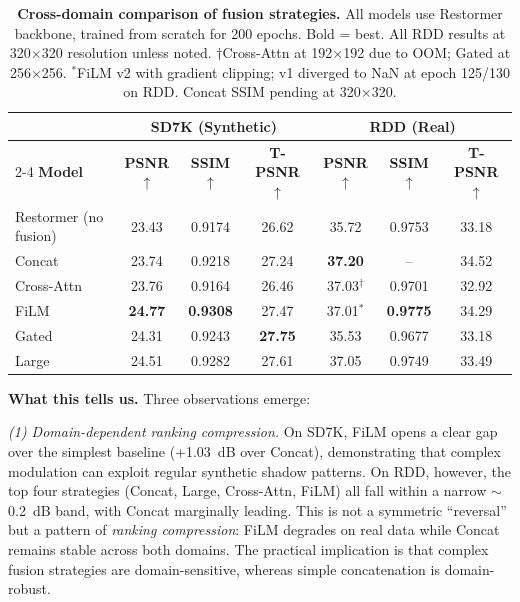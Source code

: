 \documentclass[pdflatex,sn-basic,Numbered]{sn-jnl}
\theoremstyle{thmstyleone}
\theoremstyle{thmstyletwo}
\theoremstyle{thmstylethree}
\begin{document}
\begin{table}[t]
\caption{\textbf{Cross-domain comparison of fusion strategies.} All models use Restormer backbone, trained from scratch for 200 epochs. Bold = best. All RDD results at 320$\times$320 resolution unless noted. $\dagger$Cross-Attn at 192$\times$192 due to OOM; Gated at 256$\times$256. $^*$FiLM v2 with gradient clipping; v1 diverged to NaN at epoch 125/130 on RDD. Concat SSIM pending at 320$\times$320.}
\label{tab:main_results}
\footnotesize
\begin{tabular}{@{}lcccccc@{}}
\toprule
& \multicolumn{3}{c}{\textbf{SD7K (Synthetic)}} & \multicolumn{3}{c}{\textbf{RDD (Real)}} \\
\cmidrule{2-4}\cmidrule{5-7}
\textbf{Model} & \textbf{PSNR}$\uparrow$ & \textbf{SSIM}$\uparrow$ & \textbf{T-PSNR}$\uparrow$ & \textbf{PSNR}$\uparrow$ & \textbf{SSIM}$\uparrow$ & \textbf{T-PSNR}$\uparrow$ \\
\midrule
Restormer (no fusion) & 23.43 & 0.9174 & 26.62 & 35.72 & 0.9753 & 33.18 \\
Concat                & 23.74 & 0.9218 & 27.24 & \textbf{37.20} & -- & 34.52 \\
Cross-Attn            & 23.76 & 0.9164 & 26.46 & 37.03$^\dagger$ & 0.9701 & 32.92 \\
FiLM                  & \textbf{24.77} & \textbf{0.9308} & 27.47 & 37.01$^*$ & \textbf{0.9775} & 34.29 \\
Gated                 & 24.31 & 0.9243 & \textbf{27.75} & 35.53 & 0.9677 & 33.18 \\
Large                 & 24.51 & 0.9282 & 27.61 & 37.05 & 0.9749 & 33.49 \\
\bottomrule
\end{tabular}
\end{table}

\textbf{What this tells us.}
Three observations emerge:

\textit{(1) Domain-dependent ranking compression.}
On SD7K, FiLM opens a clear gap over the simplest baseline (+1.03~dB over Concat), demonstrating that complex modulation can exploit regular synthetic shadow patterns.
On RDD, however, the top four strategies (Concat, Large, Cross-Attn, FiLM) all fall within a narrow $\sim$0.2~dB band, with Concat marginally leading.
This is not a symmetric ``reversal'' but a pattern of \textit{ranking compression}: FiLM degrades on real data while Concat remains stable across both domains.
The practical implication is that complex fusion strategies are domain-sensitive, whereas simple concatenation is domain-robust.
\end{document}
